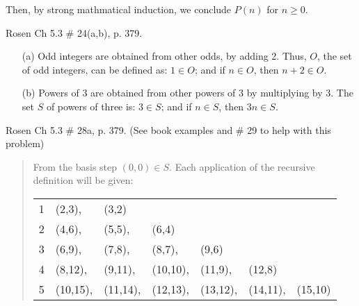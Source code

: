 \begin{questions}
\begin{solution}
  Then, by strong mathmatical induction, we conclude $P(n)$ for $n \geq 0$.
\end{solution}




 Rosen Ch 5.3 \# 24(a,b), p. 379.
    \ifprintanswers
        \vspace{-10pt}
   \fi
\begin{solution}
  \begin{itemize}
    \item[(a)] Odd integers are obtained from other odds, by adding 2. Thus, $O$, the set of odd integers, can be defined as:  $1 \in O$;  and if $n \in O$, then $n+2  \in O$.
    \item[(b)] Powers of 3 are obtained from other powers of 3 by multiplying by 3.  The set $S$ of powers of three is:  $3 \in S$; and if $n \in S$, then $3n \in S$.
  \end{itemize}
\end{solution}



 Rosen Ch 5.3 \# 28a, p. 379. (See book examples and \#
29 to help with this problem)
    \ifprintanswers
        \vspace{-10pt}
   \fi
\begin{solution}
\begin{quote}
    From the basis step $(0,0) \in S$.  Each application of the recursive definition will be given:

    \begin{tabular}{rllllll}
    1 & (2,3), & (3,2) \\
    2 & (4,6), & (5,5), & (6,4) \\
    3 & (6,9), & (7,8), & (8,7), & (9,6) \\
    4 & (8,12), & (9,11), & (10,10), & (11,9), & (12,8) \\
    5 & (10,15), & (11,14), & (12,13), & (13,12), & (14,11), & (15,10) \\
    \end{tabular}
\end{quote}
\end{solution}




\end{questions}
